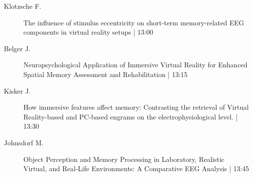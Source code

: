 \begin{symposium}
\begin{description}
                \item [ Klotzsche F.] The influence of stimulus eccentricity on short-term memory-related EEG components in virtual reality setups \textcolor{mygray}{ | 13:00}    
                
                \item [ Belger J.] Neuropsychological Application of Immersive Virtual Reality for Enhanced Spatial Memory Assessment and Rehabilitation \textcolor{mygray}{ | 13:15}    
                
                \item [ Kisker J.] How immersive features affect memory: Contrasting the retrieval of Virtual Reality-based and PC-based engrams on the electrophysiological level. \textcolor{mygray}{ | 13:30}    
                
                \item [ Johnsdorf M.] Object Perception and Memory Processing in Laboratory, Realistic Virtual, and Real-Life Environments: A Comparative EEG Analysis \textcolor{mygray}{ | 13:45}    
                
            \end{description} 
            \end{symposium}
            